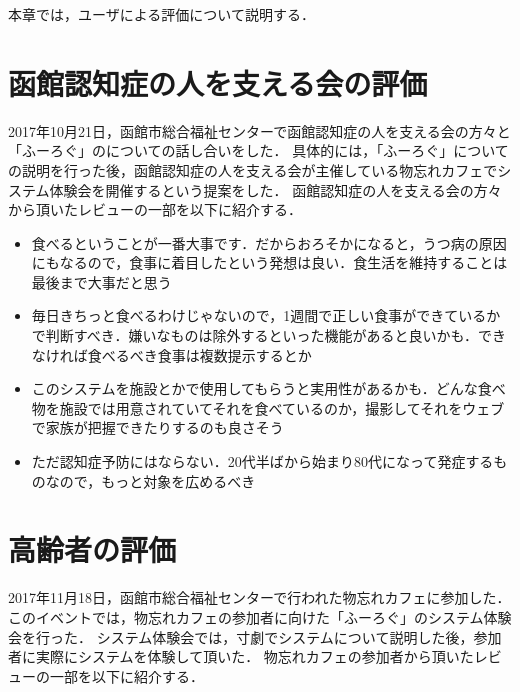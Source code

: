 \documentclass[../report]{subfiles}
\begin{document}
本章では，ユーザによる評価について説明する．

\section{函館認知症の人を支える会の評価} \label{sec:7_hyouka_monowasurecafe}
2017年10月21日，函館市総合福祉センターで函館認知症の人を支える会の方々と「ふーろぐ」のについての話し合いをした．
具体的には，「ふーろぐ」についての説明を行った後，函館認知症の人を支える会が主催している物忘れカフェでシステム体験会を開催するという提案をした．
函館認知症の人を支える会の方々から頂いたレビューの一部を以下に紹介する．

\begin{itemize}
    \item 食べるということが一番大事です．だからおろそかになると，うつ病の原因にもなるので，食事に着目したという発想は良い．食生活を維持することは最後まで大事だと思う
    \item 毎日きちっと食べるわけじゃないので，1週間で正しい食事ができているかで判断すべき．嫌いなものは除外するといった機能があると良いかも．できなければ食べるべき食事は複数提示するとか
    \item このシステムを施設とかで使用してもらうと実用性があるかも．どんな食べ物を施設では用意されていてそれを食べているのか，撮影してそれをウェブで家族が把握できたりするのも良さそう
    \item ただ認知症予防にはならない．20代半ばから始まり80代になって発症するものなので，もっと対象を広めるべき
\end{itemize}

\section{高齢者の評価} \label{sec:7_hyouka_system}
2017年11月18日，函館市総合福祉センターで行われた物忘れカフェに参加した．
このイベントでは，物忘れカフェの参加者に向けた「ふーろぐ」のシステム体験会を行った．
システム体験会では，寸劇でシステムについて説明した後，参加者に実際にシステムを体験して頂いた．
物忘れカフェの参加者から頂いたレビューの一部を以下に紹介する．
\end{document}

